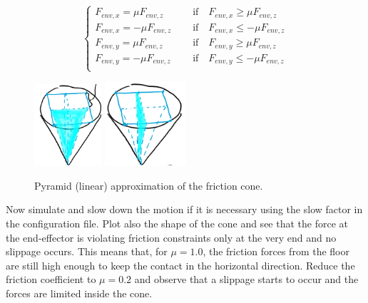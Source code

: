 \documentclass[11pt]{article}
\begin{document}
\begin{equation*}
\begin{cases}
F_{env, x} = \mu F_{env, z}  \quad &\text{   if}\quad F_{env, x} \geq \mu F_{env, z} \\ 
F_{env, x} = -\mu F_{env, z}  \quad &\text{   if}\quad F_{env, x} \leq -\mu F_{env, z} \\ 
F_{env, y} = \mu F_{env, z}  \quad &\text{   if}\quad F_{env, y} \geq \mu F_{env, z} \\ 
F_{env, y} = -\mu F_{env, z}  \quad &\text{   if}\quad F_{env, y} \leq -\mu F_{env, z} \\ 
\end{cases}
\end{equation*}
%
 \begin{figure}[bht]
 	\centering
 	\includegraphics[width=2.5cm]{fcone2.png}
 		\includegraphics[width=3cm]{fcone.png}
 	\caption{Pyramid (linear) approximation of the friction cone.}
 	\label{fig:fcone}
 \end{figure}
Now simulate and slow down the motion if it is necessary using the slow factor in the configuration file. 
Plot also the shape of the cone and  see that the force at the end-effector is violating friction constraints only at the very end and no slippage occurs. This means that, for $\mu = 1.0$, the friction forces from the floor are still high enough to keep the contact in the horizontal direction.  Reduce the friction coefficient to $\mu = 0.2$ and observe that a slippage starts to occur and the forces are limited inside the cone.  
% 
\end{document}
